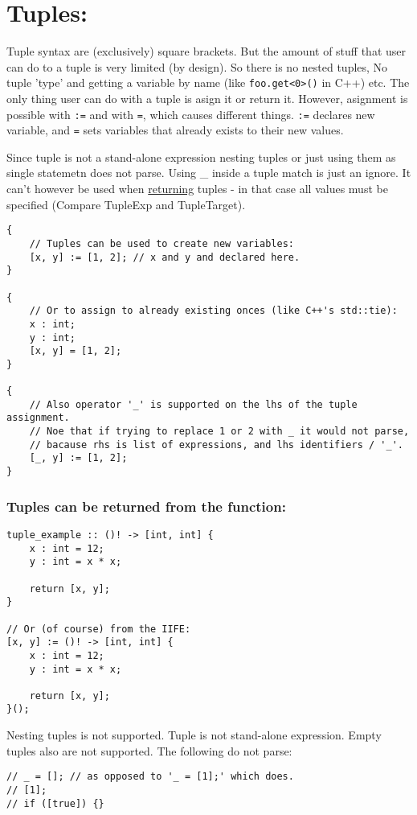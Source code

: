 \documentclass[11pt]{article}
\begin{document}
\section*{Tuples:}
\label{sec:org2d1f415}

Tuple syntax are (exclusively) square brackets. But the amount of stuff that
user can do to a tuple is very limited (by design). So there is no nested
tuples, No tuple 'type' and getting a variable by name (like
\texttt{foo.get<0>()} in C++) etc.  The only thing user can do with a tuple is
asign it or return it. However, asignment is possible with \texttt{:=} and with
\texttt{=}, which causes different things. \texttt{:=} declares new variable, and
\texttt{=} sets variables that already exists to their new values.

Since tuple is not a stand-alone expression nesting tuples or just using them as
single statemetn does not parse. Using \_ inside a tuple match is just an
ignore. It can't however be used when \uline{returning} tuples - in that case all
values must be specified (Compare TupleExp and TupleTarget).

\begin{verbatim}
{
    // Tuples can be used to create new variables:
    [x, y] := [1, 2]; // x and y and declared here.
}

{
    // Or to assign to already existing onces (like C++'s std::tie):
    x : int;
    y : int;
    [x, y] = [1, 2];
}

{
    // Also operator '_' is supported on the lhs of the tuple assignment.
    // Noe that if trying to replace 1 or 2 with _ it would not parse,
    // bacause rhs is list of expressions, and lhs identifiers / '_'.
    [_, y] := [1, 2];
}
\end{verbatim}

\subsubsection*{Tuples can be returned from the function:}
\label{sec:org3cdeaff}
\begin{verbatim}
tuple_example :: ()! -> [int, int] {
    x : int = 12;
    y : int = x * x;

    return [x, y];
}

// Or (of course) from the IIFE:
[x, y] := ()! -> [int, int] {
    x : int = 12;
    y : int = x * x;

    return [x, y];
}();
\end{verbatim}

Nesting tuples is not supported. Tuple is not stand-alone expression. Empty
tuples also are not supported. The following do not parse:
\begin{verbatim}
// _ = []; // as opposed to '_ = [1];' which does.
// [1];
// if ([true]) {}
\end{verbatim}
\end{document}
